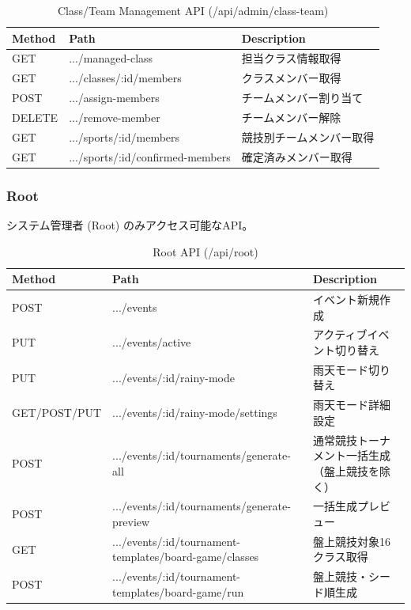 \documentclass[paper=a4, fontsize=11pt]{jlreq}
\begin{document}
\begin{table}[H]
    \centering
    \caption{Class/Team Management API (/api/admin/class-team)}
    \begin{tabularx}{\textwidth}{|l|l|X|}
        \toprule
        Method & Path & Description \\
        \midrule
        GET & .../managed-class & 担当クラス情報取得 \\
        GET & .../classes/:id/members & クラスメンバー取得 \\
        POST & .../assign-members & チームメンバー割り当て \\
        DELETE & .../remove-member & チームメンバー解除 \\
        GET & .../sports/:id/members & 競技別チームメンバー取得 \\
        GET & .../sports/:id/confirmed-members & 確定済みメンバー取得 \\
        \bottomrule
    \end{tabularx}
\end{table}

\subsubsection{Root}
システム管理者 (Root) のみアクセス可能なAPI。

\begin{table}[H]
    \centering
    \caption{Root API (/api/root)}
    \begin{tabularx}{\textwidth}{|p{3.1cm}|X|p{4.3cm}|}
        \toprule
        Method & Path & Description \\
        \midrule
        POST & .../events & イベント新規作成 \\
        PUT & .../events/active & アクティブイベント切り替え \\
        PUT & .../events/:id/rainy-mode & 雨天モード切り替え \\
        GET/POST/PUT & .../events/:id/rainy-mode/settings & 雨天モード詳細設定 \\
        POST & .../events/:id/tournaments/generate-all & 通常競技トーナメント一括生成（盤上競技を除く） \\
        POST & .../events/:id/tournaments/generate-preview & 一括生成プレビュー \\
        GET & .../events/:id/tournament-templates/board-game/classes & 盤上競技対象16クラス取得 \\
        POST & .../events/:id/tournament-templates/board-game/run & 盤上競技・シード順生成 \\
        \bottomrule
    \end{tabularx}
\end{table}
\end{document}
